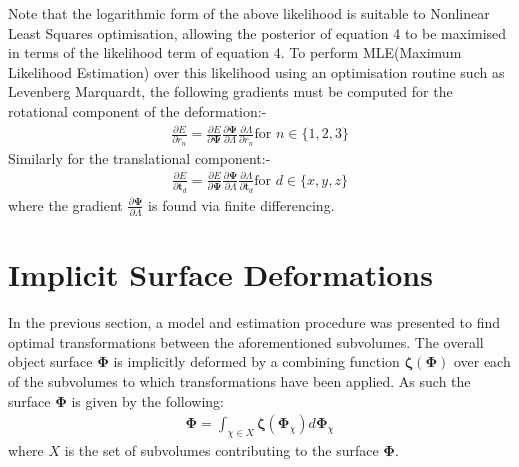 Note that the logarithmic form of the above likelihood is suitable to Nonlinear Least Squares optimisation, allowing the posterior of equation 4 
to be maximised in terms of the likelihood term of equation 4. To perform MLE(Maximum Likelihood Estimation) over this likelihood using 
an optimisation routine such as Levenberg Marquardt, the following gradients must be computed for the rotational component of the 
deformation:-
\begin{equation}
\begin{split}
\frac{\partial E}{\partial r_{n}} = \frac{\partial E}{\partial \bm{\Psi}} \frac{\partial \bm{\Psi}}{\partial \Lambda} \frac{\partial \Lambda}{\partial r_{n}} \text{for } n \in \{1,2,3\}
\end{split}
\end{equation}
Similarly for the translational component:-
\begin{equation}
\begin{split}
\frac{\partial E}{\partial \bm{t}_{d}} = \frac{\partial E}{\partial \bm{\Psi}} \frac{\partial \bm{\Psi}}{\partial \Lambda} \frac{\partial \Lambda}{\partial \bm{t}_{d}} \text{for } d \in  \{x,y,z\}
\end{split}
\end{equation}
where the gradient $\frac{\partial \bm{\Psi}}{\partial \Lambda}$ is found via finite differencing.

\section{Implicit Surface Deformations}
In the previous section, a model and estimation procedure was presented to find optimal transformations between the aforementioned subvolumes.
The overall object surface $\bm{\Phi}$ is implicitly deformed by a combining function $\bm{\zeta}(\bm{\Phi})$ over each of the subvolumes to which transformations have been applied.
As such the surface $\bm{\Phi}$ is given by the following:
\begin{equation}
\begin{split}
\bm{\Phi} = \int_{\chi \in X} \bm{\zeta}(\bm{\Phi}_{\chi}) d \bm{\Phi}_{\chi}
\end{split}
\end{equation}
where $X$ is the set of subvolumes contributing to the surface $\bm{\Phi}$.

